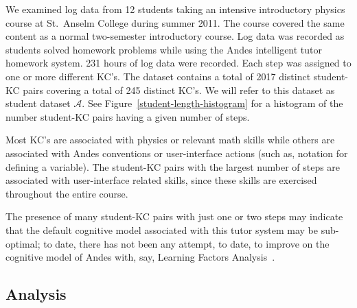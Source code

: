 \documentclass{acmlarge-edm}
\begin{document}
We examined log data from 12 students taking an intensive introductory
physics course at St.\ Anselm College during summer 2011.  The course
covered the same content as a normal two-semester introductory course.
Log data was recorded as students solved homework problems while using
the Andes intelligent tutor homework system.  231 hours of log data
were recorded.
Each step was assigned to one or more different KC's.  The dataset
contains a total of 2017 distinct student-KC pairs covering a total of
245 distinct KC's.  We will refer to this dataset as student dataset
$\mathcal{A}$.  See Figure~\ref{student-length-histogram} for a
histogram of the number student-KC pairs having a given number of
steps.

Most KC's are associated with physics
or relevant math skills while others are associated with 
Andes conventions or user-interface actions (such as, notation
for defining a variable).  The student-KC pairs with the largest 
number of steps are associated with user-interface related skills,
since these skills are exercised throughout the entire course. 

The presence of many student-KC pairs with just one or two
steps may indicate that the default cognitive model associated 
with this tutor system may be sub-optimal; to date, there has not 
been any attempt, to date, to improve on the cognitive model of 
Andes with, say, Learning Factors Analysis~\cite{cen_learning_2006}.

\subsection{Analysis}
\end{document}
